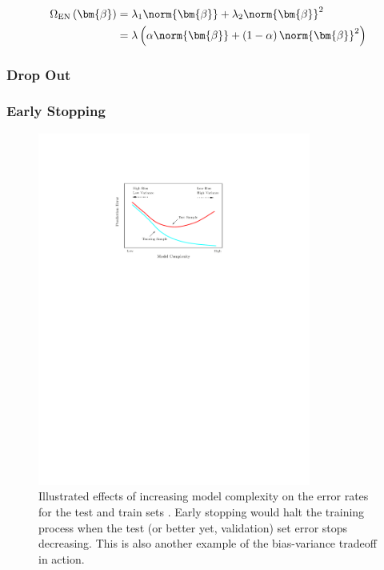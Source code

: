\begin{equation} \label{eq:elastic_net}
\begin{split}
\Omega_{\text{EN}}\left(\bm{\beta}\right) &= \lambda_{1} \norm{\bm{\beta}} + \lambda_{2} \norm{\bm{\beta}}^{2}\\
&= \lambda \left( \alpha\norm{\bm{\beta}} + \left(1-\alpha\right)\norm{\bm{\beta}}^{2} \right)
\end{split}
\end{equation}


\subsubsection{Drop Out}
\label{additional:ml:general:reg:Drop}

\subsubsection{Early Stopping}
\label{additional:ml:general:reg:early_stopping}

\begin{figure}[H]
\centering
\includegraphics[width=0.8\textwidth]{figures/ml/test_train_err_curves.pdf}
\caption{
Illustrated effects of increasing model complexity on the error rates for the test and train sets \cite{HastieTF09}.
Early stopping would halt the training process when the test (or better yet, validation) set error stops decreasing.
This is also another example of the bias-variance tradeoff in action.
}
\label{fig:additional:ml:general:early_stopping}
\end{figure}


